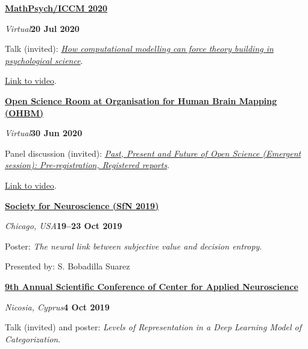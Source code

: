 \documentclass[10pt]{article}
\newenvironment{outerlist}[1][\enskip\textbullet]%
        {\begin{itemize}[#1]}{\end{itemize}%
         \vspace{-.6\baselineskip}}
\newenvironment{innerlist}[1][\enskip\textbullet]%
        {\begin{compactitem}[#1]}{\end{compactitem}}
\begin{document}
\textbf{\href{http://mathpsych.org/conferences/2020/}{MathPsych/ICCM 2020}}
\begin{outerlist}
  \item[] \textit{Virtual}\hfill\textbf{20 Jul 2020}
  \begin{innerlist}
    \item Talk (invited):  \href{https://youtu.be/8Aa9_6ahO48}{\textit{How computational modelling can force theory building in psychological science}}.
    \item  \href{https://youtu.be/8Aa9_6ahO48}{Link to video}.
  \end{innerlist}
\end{outerlist}
\vspace{8pt}


\textbf{\href{https://ohbm.github.io/osr2020/}{Open Science Room at Organisation for Human Brain Mapping (OHBM)}}
\begin{outerlist}
  \item[] \textit{Virtual}\hfill\textbf{30 Jun 2020}
  \begin{innerlist}
    \item Panel discussion (invited):  \href{https://github.com/ohbm/osr2020/issues/88}{\textit{Past, Present and Future of Open Science (Emergent session): Pre-registration, Registered reports}}.
    \item  \href{https://youtu.be/VIbD6QXM8Zc}{Link to video}.
  \end{innerlist}
\end{outerlist}
\vspace{8pt}


\textbf{\href{https://www.sfn.org/meetings/neuroscience-2019}{Society for Neuroscience (SfN 2019)}}
\begin{outerlist}
  \item[] \textit{Chicago, USA}\hfill\textbf{19--23 Oct 2019}
  \begin{innerlist}
    \item Poster: \textit{The neural link between subjective value and decision entropy}.
    \item{Presented by: S. Bobadilla Suarez}
  \end{innerlist}
\end{outerlist}
\vspace{8pt}



\textbf{\href{https://www.cancyprus.org/wp-content/uploads/2019/10/Conference-Booklet-2019-print.pdf}{9th Annual Scientific Conference of Center for Applied Neuroscience}}
\begin{outerlist}
  \item[] \textit{Nicosia, Cyprus}\hfill\textbf{4 Oct 2019}
  \begin{innerlist}
    \item Talk (invited) and poster:  \textit{Levels of Representation in a Deep Learning Model of Categorization}.
  \end{innerlist}
\end{outerlist}
\vspace{8pt}
\end{document}
